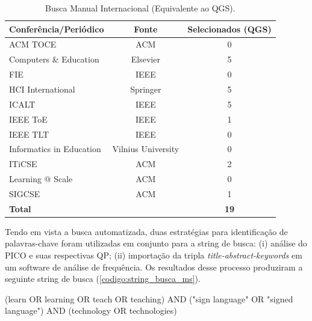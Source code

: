 \begin{table}[htb]
\centering
\caption{Busca Manual Internacional (Equivalente ao QGS).}
\label{table:c2:busca-manual-internacional}
\begin{tabular}{l|c|c} \hline
\textbf{Conferência/Periódico} & \textbf{Fonte}     & \textbf{Selecionados (QGS)} \\ \hline
ACM TOCE                       & ACM                & 0            \\ 
Computers \& Education         & Elsevier           & 5            \\ 
FIE                            & IEEE               & 0            \\ 
HCI International              & Springer           & 5            \\ 
ICALT                          & IEEE               & 5            \\ 
IEEE ToE                       & IEEE               & 1            \\ 
IEEE TLT                       & IEEE               & 0            \\ 
Informatics in Education       & Vilnius University & 0            \\ 
ITiCSE                         & ACM                & 2            \\ 
Learning @ Scale               & ACM                & 0            \\ 
SIGCSE                         & ACM                & 1            \\ \hline
\multicolumn{2}{l}{\textbf{Total}}                  & \textbf{19}  \\ \hline
\end{tabular}
\end{table}

Tendo em vista a busca automatizada, duas estratégias para identificação de palavras-chave foram utilizadas em conjunto para a string de busca: (i) análise do PICO e suas respectivas QP; (ii) importação da tripla \textit{title-abstract-keywords} em um software de análise de frequência. Os resultados desse processo produziram a seguinte string de busca (\autoref{codigo:string_busca_ms}).

\begin{codigo}[caption={String de Busca do MS}, label={codigo:string_busca_ms}]
    (learn OR learning OR teach OR teaching) AND
    ("sign language" OR "signed language") AND
    (technology OR technologies)
\end{codigo}

